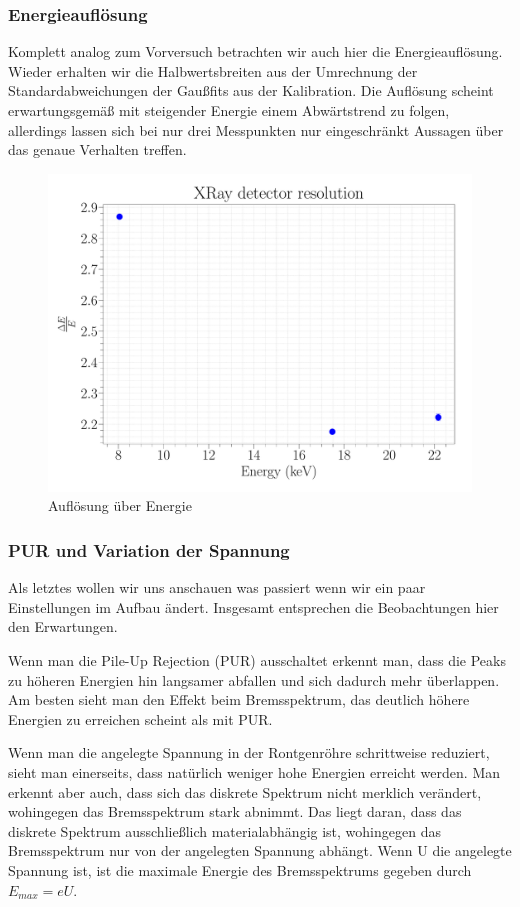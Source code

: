 \documentclass[a4paper,14pt]{article}
\begin{document}
\subsubsection{Energieauflösung}
Komplett analog zum Vorversuch betrachten wir auch hier die Energieauflösung. Wieder erhalten wir die Halbwertsbreiten aus der Umrechnung der Standardabweichungen der Gaußfits aus der Kalibration. Die Auflösung scheint erwartungsgemäß mit steigender Energie einem Abwärtstrend zu folgen, allerdings lassen sich bei nur drei Messpunkten nur eingeschränkt Aussagen über das genaue Verhalten treffen.

\begin{figure}[H]
\centering
\includegraphics[width=\textwidth]{../Figures/xray_resolution.pdf}
\caption{Auflösung über Energie}
\label{XRay_resolution}
\end{figure}

\subsubsection{PUR und Variation der Spannung}
Als letztes wollen wir uns anschauen was passiert wenn wir ein paar Einstellungen im Aufbau ändert. Insgesamt entsprechen die Beobachtungen hier den Erwartungen.

Wenn man die Pile-Up Rejection (PUR) ausschaltet erkennt man, dass die Peaks zu höheren Energien hin langsamer abfallen und sich dadurch mehr überlappen. Am besten sieht man den Effekt beim Bremsspektrum, das deutlich höhere Energien zu erreichen scheint als mit PUR.

Wenn man die angelegte Spannung in der Rontgenröhre schrittweise reduziert, sieht man einerseits, dass natürlich weniger hohe Energien erreicht werden. Man erkennt aber auch, dass sich das diskrete Spektrum nicht merklich verändert, wohingegen das Bremsspektrum stark abnimmt. Das liegt daran, dass das diskrete Spektrum ausschließlich materialabhängig ist, wohingegen das Bremsspektrum nur von der angelegten Spannung abhängt. Wenn U die angelegte Spannung ist, ist die maximale Energie des Bremsspektrums gegeben durch $E_{max} = eU$.
\end{document}
